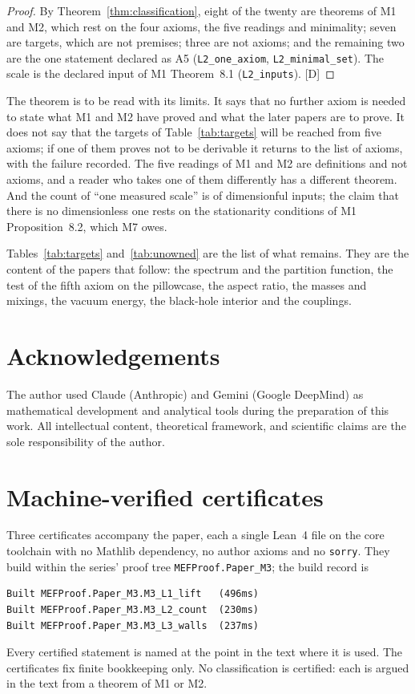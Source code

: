 \documentclass[11pt,a4paper]{article}
\theoremstyle{plain}
\theoremstyle{definition}
\theoremstyle{remark}
\newcommand{\rigD}{[\textup{D}]}
\begin{document}
\begin{proof}
By Theorem~\ref{thm:classification}, eight of the twenty are theorems of M1 and M2, which rest on the four axioms, the five readings and minimality; seven are targets, which are not premises; three are not axioms; and the remaining two are the one statement declared as A5 (\texttt{L2\_one\_axiom}, \texttt{L2\_minimal\_set}). The scale is the declared input of M1 Theorem~8.1 (\texttt{L2\_inputs}). \rigD
\end{proof}

The theorem is to be read with its limits. It says that no further axiom is needed to state what M1 and M2 have proved and what the later papers are to prove. It does not say that the targets of Table~\ref{tab:targets} will be reached from five axioms; if one of them proves not to be derivable it returns to the list of axioms, with the failure recorded. The five readings of M1 and M2 are definitions and not axioms, and a reader who takes one of them differently has a different theorem. And the count of ``one measured scale'' is of dimensionful inputs; the claim that there is no dimensionless one rests on the stationarity conditions of M1 Proposition~8.2, which M7 owes.

Tables~\ref{tab:targets} and~\ref{tab:unowned} are the list of what remains. They are the content of the papers that follow: the spectrum and the partition function, the test of the fifth axiom on the pillowcase, the aspect ratio, the masses and mixings, the vacuum energy, the black-hole interior and the couplings.

\section*{Acknowledgements}
The author used Claude (Anthropic) and Gemini (Google DeepMind) as mathematical development and analytical tools during the preparation of this work. All intellectual content, theoretical framework, and scientific claims are the sole responsibility of the author.

\appendix





\section{Machine-verified certificates}\label{app:lean}

Three certificates accompany the paper, each a single Lean~4 file on the core toolchain with no Mathlib dependency, no author axioms and no \texttt{sorry}. They build within the series' proof tree \texttt{MEFProof.Paper\_M3}; the build record is
\begin{lstlisting}
Built MEFProof.Paper_M3.M3_L1_lift   (496ms)
Built MEFProof.Paper_M3.M3_L2_count  (230ms)
Built MEFProof.Paper_M3.M3_L3_walls  (237ms)
\end{lstlisting}
Every certified statement is named at the point in the text where it is used. The certificates fix finite bookkeeping only. No classification is certified: each is argued in the text from a theorem of M1 or M2.
\end{document}
